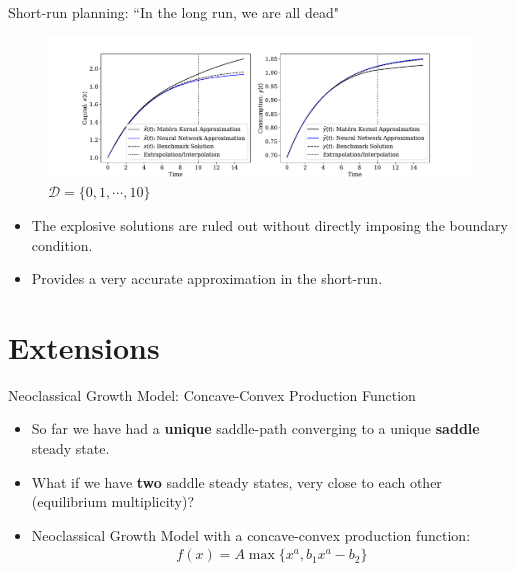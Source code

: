 \documentclass[aspectratio=169,10pt]{beamer}
\newcommand{\emphcolor}[1]{\textbf{\textcolor{emphcolorval}{#1}}}
\begin{document}
\begin{frame}{Short-run planning: ``In the long run, we are all dead" }
	\begin{figure}[t!]
		\centering
		\includegraphics[width=\textwidth]{figs/neoclassical_growth_short_planning.pdf}
		\caption*{$\mathcal{D} = \{0,1,\cdots,10\}$}
		\vspace{-4mm}
	\end{figure}
	\begin{itemize}
		\item The explosive solutions are ruled out without directly imposing the boundary condition.
		\vspace{0.1in}
		\item Provides a very accurate approximation in the short-run.
	\end{itemize}
\end{frame}

\section{Extensions}

\begin{frame}{Neoclassical Growth Model: Concave-Convex Production Function}
	\begin{itemize}
		\item So far we have had a \emphcolor{unique} saddle-path converging to a unique \emphcolor{saddle} steady state.
		\vspace{0.1in}
		\item What if we have \emphcolor{two} saddle steady states, very close to each other (equilibrium multiplicity)?
		\vspace{0.1in}
		\item Neoclassical Growth Model with a concave-convex production function:
		\begin{align*}
			f(x) = A \max\{x^a, b_1x^a - b_2\}
		\end{align*}
	\end{itemize}
\end{frame}
\end{document}

